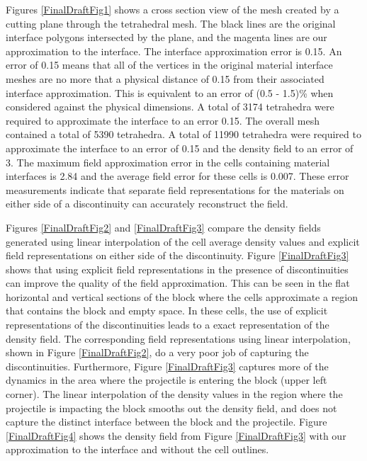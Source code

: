 \documentclass{siggraph}
\begin{document}
Figures \ref{FinalDraftFig1} shows a cross section view of the mesh
created by a cutting plane through the tetrahedral mesh. 
The black lines are the original interface
polygons intersected by the plane, and the magenta lines are our approximation to the interface. 
The interface approximation error is 0.15. 
An error of 0.15 means that all of the vertices in the original material interface
meshes are no more that a physical distance of 0.15 from their
associated interface approximation. This is equivalent to an error of (0.5 - 1.5)\%
when considered against the physical dimensions. A total of 3174 tetrahedra
were required to approximate the interface to an error 0.15. The overall mesh 
contained a total of 5390 tetrahedra.
A total of 11990 tetrahedra were required to approximate the interface to an error of 0.15 and
the density field to an error of 3.
The maximum field approximation error in the cells containing material interfaces
is 2.84 and the average field error for these cells is 0.007. 
These error measurements indicate that separate field representations
for the materials on either side of a discontinuity can accurately reconstruct the field.

Figures \ref{FinalDraftFig2} and \ref{FinalDraftFig3} compare the density fields
generated using linear interpolation of the cell average density values and
explicit field representations on either side of the discontinuity.
Figure \ref{FinalDraftFig3} shows that using explicit field representations in the presence
of discontinuities can improve the quality of the field approximation. This
can be seen in the flat horizontal and vertical sections of the block where the cells
approximate a region that contains the block and empty space. In these cells, the use of
explicit representations of the discontinuities leads to a exact representation of the density
field. The corresponding field representations using linear interpolation, shown in
Figure \ref{FinalDraftFig2}, do a very poor job of capturing the discontinuities. 
Furthermore, Figure \ref{FinalDraftFig3} captures more of the dynamics
in the area where the projectile is entering the block (upper left corner). 
The linear interpolation of the density values in the region where the 
projectile is impacting the block smooths out the density field, and does not 
capture the distinct interface between the block and the projectile.
Figure \ref{FinalDraftFig4} shows the density field from  Figure \ref{FinalDraftFig3}
with our approximation to the interface and without the cell outlines.
\end{document}
